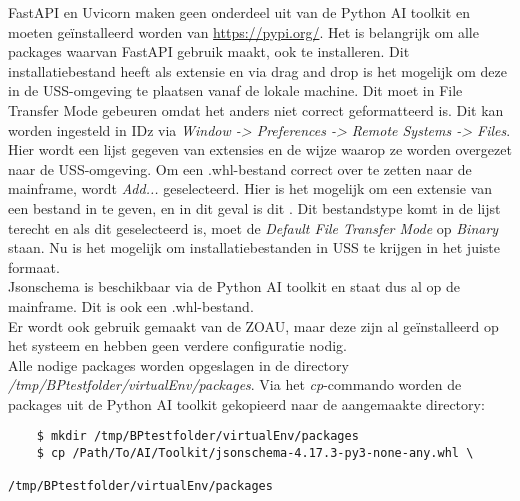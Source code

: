 FastAPI en Uvicorn maken geen onderdeel uit van de Python AI toolkit en moeten geïnstalleerd worden van \url{https://pypi.org/}. Het is belangrijk om alle packages waarvan FastAPI gebruik maakt, ook te installeren. Dit installatiebestand heeft als extensie  en via drag and drop is het mogelijk om deze in de USS-omgeving te plaatsen vanaf de lokale machine. Dit moet in File Transfer Mode  gebeuren omdat het anders niet correct geformatteerd is. Dit kan worden ingesteld in IDz via \textit{Window -> Preferences -> Remote Systems -> Files}. Hier wordt een lijst gegeven van extensies en de wijze waarop ze worden overgezet naar de USS-omgeving. Om een .whl-bestand correct over te zetten naar de mainframe, wordt \textit{Add...} geselecteerd. Hier is het mogelijk om een extensie van een bestand in te geven, en in dit geval is dit . Dit bestandstype komt in de lijst terecht en als dit geselecteerd is, moet de \textit{Default File Transfer Mode} op \textit{Binary} staan. Nu is het mogelijk om installatiebestanden in USS te krijgen in het juiste formaat. \\

Jsonschema is beschikbaar via de Python AI toolkit en staat dus al op de mainframe. Dit is ook een .whl-bestand. \\

Er wordt ook gebruik gemaakt van de ZOAU, maar deze zijn al geïnstalleerd op het systeem en hebben geen verdere configuratie nodig. \\

Alle nodige packages worden opgeslagen in de directory \textit{/tmp/BPtestfolder/virtualEnv/packages}. Via het \textit{cp}-commando worden de packages uit de Python AI toolkit gekopieerd naar de aangemaakte directory: \\

\begin{lstlisting}
    $ mkdir /tmp/BPtestfolder/virtualEnv/packages
    $ cp /Path/To/AI/Toolkit/jsonschema-4.17.3-py3-none-any.whl \
                                         /tmp/BPtestfolder/virtualEnv/packages
\end{lstlisting} 

